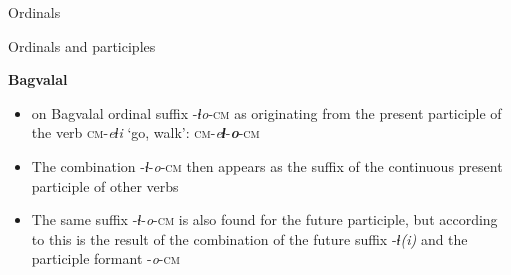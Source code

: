 \begin{frame}{Ordinals}
\end{frame}

\begin{frame}{Ordinals and participles}
\begin{center}
    \textbf{Bagvalal}
\end{center}
\begin{itemize}
    \item \citep[157]{kibrik2001} on Bagvalal ordinal suffix -\textit{ɬo}-\textsc{cm} as originating from the present participle of the verb \textsc{cm}-\textit{eɬi} `go, walk': \textsc{cm}-\textit{e\textbf{ɬ}}-\textit{\textbf{o}}-\textsc{cm}
    \item The combination -\textit{ɬ}-\textit{o}-\textsc{cm} then appears as the suffix of the continuous present participle of other verbs \citep[102]{kibrik2001} 
    \item The same suffix -\textit{ɬ}-\textit{o}-\textsc{cm} is also found for the future participle, but according to \citep[86]{kibrik2001} this is the result of the combination of the future suffix -\textit{ɬ(i)} and the participle formant -\textit{o}-\textsc{cm}
\end{itemize}

\end{frame}

